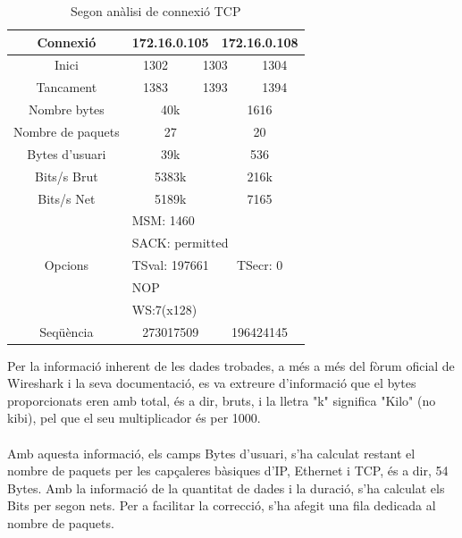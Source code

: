 \documentclass{article}
\begin{document}
\begin{table}[!h]
\centering
\begin{tabular}{c|cccccc}
Connexió &\multicolumn{3}{c}{172.16.0.105} &\multicolumn{3}{c}{172.16.0.108}\\
\hline
Inici &\multicolumn{2}{c}{1302} &\multicolumn{2}{c}{1303} &\multicolumn{2}{c}{1304}\\
\hline
Tancament &\multicolumn{2}{c}{1383} &\multicolumn{2}{c}{1393} 
&\multicolumn{2}{c}{1394}\\
\hline
Nombre bytes &\multicolumn{3}{c}{40k} &\multicolumn{3}{c}{1616}\\
\hline
Nombre de paquets &\multicolumn{3}{c}{27} &\multicolumn{3}{c}{20}\\
\hline
Bytes d'usuari &\multicolumn{3}{c}{39k} &\multicolumn{3}{c}{536}\\
\hline
Bits/s Brut &\multicolumn{3}{c}{5383k} &\multicolumn{3}{c}{216k}\\
\hline
Bits/s Net &\multicolumn{3}{c}{5189k} &\multicolumn{3}{c}{7165}\\
\hline
\multirow{5}{*}{Opcions} &\multicolumn{6}{l}{MSM: 1460} \\
&\multicolumn{6}{l}{SACK: permitted}\\
&\multicolumn{3}{c}{TSval: 197661} 
&\multicolumn{3}{c}{TSecr: 0}\\
&\multicolumn{6}{l}{NOP}\\
&\multicolumn{6}{l}{WS:7(x128)}\\
\hline
Seqüència &\multicolumn{3}{c}{273017509} &\multicolumn{3}{c}{196424145}\\
\end{tabular}
\caption{Segon anàlisi de connexió TCP}
\label{ana:snd}
\end{table}
Per la informació inherent de les dades trobades, a més a més del fòrum
oficial de Wireshark i la seva documentació, es va extreure d'informació
que el bytes proporcionats eren amb total, és a dir, bruts, i la lletra
"k" significa "Kilo" (no kibi), pel que el seu multiplicador és per 1000.\\
\\
Amb aquesta informació, els camps Bytes d'usuari, s'ha calculat restant el nombre
de paquets per les capçaleres bàsiques d'IP, Ethernet i TCP, és a dir, 54 Bytes.
Amb la informació de la quantitat de dades i la duració, s'ha calculat els
Bits per segon nets. Per a facilitar la correcció, s'ha afegit una
fila dedicada al nombre de paquets.\\\\
\end{document}
